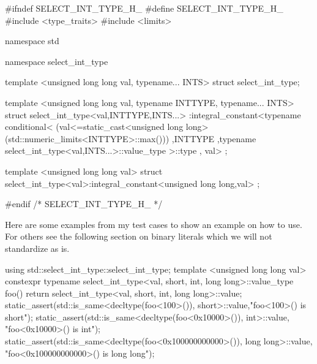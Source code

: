\documentclass[ebook,11pt,article]{memoir}
\begin{document}
\begin{codeblock}
#ifndef SELECT_INT_TYPE_H_
#define SELECT_INT_TYPE_H_
#include <type_traits>
#include <limits>

namespace std {
namespace select_int_type {

template <unsigned long long val, typename... INTS>
struct select_int_type;

template <unsigned long long val, typename INTTYPE, typename... INTS>
struct select_int_type<val,INTTYPE,INTS...>
:integral_constant<typename conditional<
(val<=static_cast<unsigned long long>(std::numeric_limits<INTTYPE>::max()))
,INTTYPE
,typename select_int_type<val,INTS...>::value_type >::type , val> {
};

template <unsigned long long val>
struct select_int_type<val>:integral_constant<unsigned long long,val>{
};

}}
#endif /* SELECT_INT_TYPE_H_ */
\end{codeblock}

Here are some examples from my test cases to show an example on how to use. For others see the following section on binary literals which we will not standardize as is.

\begin{codeblock}
using std::select_int_type::select_int_type;
template <unsigned long long val>
constexpr
typename select_int_type<val,
short, int, long long>::value_type
foo() {
    return  select_int_type<val,
            short, int, long long>::value;
}
static_assert(std::is_same<decltype(foo<100>()), 
              short>::value,"foo<100>() is short");
static_assert(std::is_same<decltype(foo<0x10000>()), int>::value,
              "foo<0x10000>() is int");
static_assert(std::is_same<decltype(foo<0x100000000000>()), long long>::value,
              "foo<0x100000000000>() is long long");
\end{codeblock}
\end{document}
